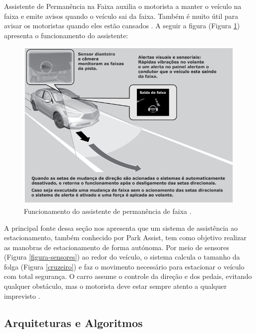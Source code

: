 
Assistente de Permanência na Faixa auxilia o motorista a manter o veículo na faixa e emite avisos quando o veículo sai da faixa. Também é muito útil para avisar os motoristas quando eles estão cansados \cite{caio}. A seguir a figura (Figura \ref{assistente}) apresenta o funcionamento do assistente:

\begin{figure}[H]
\centering
\includegraphics[width=\textwidth]{Figures/assistente.png}
\caption{Funcionamento do assistente de permanência de faixa \cite{caio}.}
\label{assistente}
\end{figure}



A principal fonte dessa seção nos apresenta que um sistema de assistência ao estacionamento, também conhecido por Park Assist, tem como objetivo realizar as manobras de estacionamento de forma autónoma. Por meio de sensores (Figura \ref{figura-sensores}) ao redor do veículo, o sistema calcula o tamanho da folga (Figura \ref{cruzeiro}) e faz o movimento necessário para estacionar o veículo com total segurança. O carro assume o controle da direção e dos pedais, evitando qualquer obstáculo, mas o motorista deve estar sempre atento a qualquer imprevisto \cite{caio}.

\subsection{Arquiteturas e Algoritmos}

